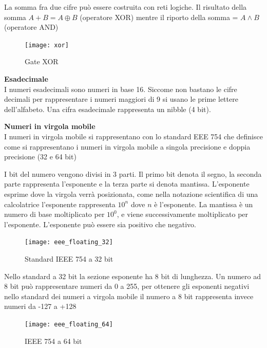 La somma fra due cifre può essere costruita con reti logiche. Il risultato della somma $ A + B = A \oplus B $ (operatore XOR) mentre il riporto della somma = $ A \land B $ (operatore AND)

\begin{figure}
	\centering
	\caption{Gate XOR}
	\texttt{[image: xor]}
\end{figure}

\begin{defn}
	\textbf{Esadecimale} \\
	
	I numeri esadecimali sono numeri in base 16. Siccome non bastano le cifre decimali per rappresentare i numeri maggiori di 9 si usano le prime lettere dell'alfabeto.
	Una cifra esadecimale rappresenta un nibble (4 bit).
\end{defn}

\begin{defn}
	\textbf{Numeri in virgola mobile} \\
	
	I numeri in virgola mobile si rappresentano con lo standard EEE 754 che definisce come si rappresentano i numeri in virgola mobile a singola precisione e doppia precisione (32 e 64 bit)
	
	I bit del numero vengono divisi in 3 parti. Il primo bit denota il segno, la seconda parte rappresenta l'esponente e la terza parte si denota mantissa. L'esponente esprime dove la virgola verrà posizionata, come nella notazione scientifica di una calcolatrice l'esponente rappresenta $ 10^{n} $ dove $ n $ è l'esponente. La mantissa è un numero di base moltiplicato per $ 10^0 $, e viene successivamente moltiplicato per l'esponente.
	L'esponente può essere sia positivo che negativo.
	
	\begin{figure}
		\caption{Standard IEEE 754 a 32 bit}
		\texttt{[image: eee\_floating\_32]}
	\end{figure}
	
	Nello standard a 32 bit la sezione esponente ha 8 bit di lunghezza. Un numero ad 8 bit può rappresentare numeri da 0 a 255, per ottenere gli esponenti negativi nello standard dei numeri a virgola mobile il numero a 8 bit rappresenta invece numeri da -127 a +128
	
	\begin{figure}
		\caption{IEEE 754 a 64 bit}
		\texttt{[image: eee\_floating\_64]}
	\end{figure}
\end{defn}



